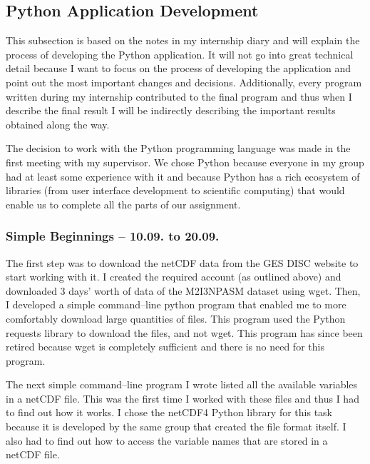 \documentclass[../00_main.tex]{subfiles}
\begin{document}
\subsection{Python Application Development}

This subsection is based on the notes in my internship diary and will explain
the process of developing the Python application. It will not go into great
technical detail because I want to focus on the process of developing the
application and point out the most important changes and decisions. 
Additionally, every program written during my internship contributed to the 
final program and thus when I describe the final result I will be indirectly 
describing the important results obtained along the way.\newline

The decision to work with the Python programming language was made in the first
meeting with my supervisor. We chose Python because everyone in my group had 
at least some experience with it and because Python has a rich ecosystem of 
libraries (from user interface development to scientific computing) that would 
enable us to complete all the parts of our assignment.\newline

\subsubsection{Simple Beginnings -- 10.09. to 20.09.}

The first step was to download the netCDF data from the GES DISC website to
start working with it. I created the required account (as outlined above) and 
downloaded 3 days' worth of data of the M2I3NPASM dataset using wget. Then, I 
developed a simple command--line python program that enabled me to more
comfortably download large quantities of files. This program used the Python
requests \cite{py-requests} library to download the files, and not wget. This 
program has since been retired because wget is completely sufficient and there 
is no need for this program. \newline

The next simple command--line program I wrote listed all the available 
variables in a netCDF file. This was the first time I worked with these files 
and thus I had to find out how it works. I chose the netCDF4 Python library
\cite{netcdf4} for this task because it is developed by the same group that 
created the file format itself. I also had to find out how to access the 
variable names that are stored in a netCDF file.\newline
\end{document}
